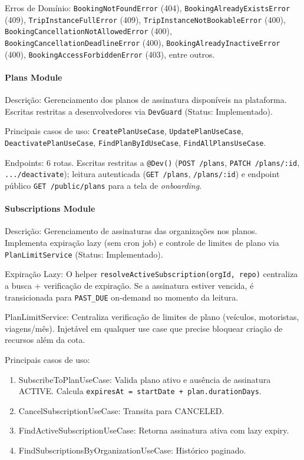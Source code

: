 Erros de Domínio: \texttt{BookingNotFoundError} (404), \texttt{BookingAlreadyExistsError} (409), \texttt{TripInstanceFullError} (409), \texttt{TripInstanceNotBookableError} (400), \texttt{BookingCancellationNotAllowedError} (400), \texttt{BookingCancellationDeadlineError} (400), \texttt{BookingAlreadyInactiveError} (400), \texttt{BookingAccessForbiddenError} (403), entre outros.

\paragraph{Plans Module}

Descrição: Gerenciamento dos planos de assinatura disponíveis na plataforma. Escritas restritas a desenvolvedores via \texttt{DevGuard} (Status: Implementado).

Principais casos de uso: \texttt{CreatePlanUseCase}, \texttt{UpdatePlanUseCase}, \texttt{DeactivatePlanUseCase}, \texttt{FindPlanByIdUseCase}, \texttt{FindAllPlansUseCase}.

Endpoints: 6 rotas. Escritas restritas a \texttt{@Dev()} (\texttt{POST /plans}, \texttt{PATCH /plans/:id}, \texttt{.../deactivate}); leitura autenticada (\texttt{GET /plans}, \texttt{/plans/:id}) e endpoint público \texttt{GET /public/plans} para a tela de \textit{onboarding}.

\paragraph{Subscriptions Module}

Descrição: Gerenciamento de assinaturas das organizações nos planos. Implementa expiração lazy (sem cron job) e controle de limites de plano via \texttt{PlanLimitService} (Status: Implementado).

Expiração Lazy: O helper \texttt{resolveActiveSubscription(orgId, repo)} centraliza a busca + verificação de expiração. Se a assinatura estiver vencida, é transicionada para \texttt{PAST\_DUE} on-demand no momento da leitura.

PlanLimitService: Centraliza verificação de limites de plano (veículos, motoristas, viagens/mês). Injetável em qualquer use case que precise bloquear criação de recursos além da cota.

Principais casos de uso:
\begin{enumerate}
\item SubscribeToPlanUseCase: Valida plano ativo e ausência de assinatura ACTIVE. Calcula \texttt{expiresAt = startDate + plan.durationDays}.
\item CancelSubscriptionUseCase: Transita para CANCELED.
\item FindActiveSubscriptionUseCase: Retorna assinatura ativa com lazy expiry.
\item FindSubscriptionsByOrganizationUseCase: Histórico paginado.
\end{enumerate}

